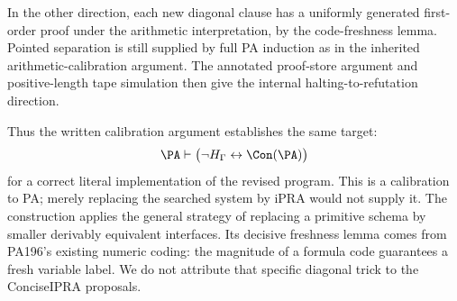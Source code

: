 In the other direction, each new diagonal clause has a uniformly generated first-order proof under the arithmetic interpretation, by the code-freshness lemma. Pointed separation is still supplied by full PA induction as in the inherited arithmetic-calibration argument. The annotated proof-store argument and positive-length tape simulation then give the internal halting-to-refutation direction.

Thus the written calibration argument establishes the same target:
\[
 \PA\vdash\bigl(\neg H_{\Gamma}\leftrightarrow\Con(\PA)\bigr)
\]
for a correct literal implementation of the revised program. This is a calibration to PA; merely replacing the searched system by iPRA would not supply it. The construction applies the general strategy of replacing a primitive schema by smaller derivably equivalent interfaces. Its decisive freshness lemma comes from PA196's existing numeric coding: the magnitude of a formula code guarantees a fresh variable label. We do not attribute that specific diagonal trick to the ConciseIPRA proposals.

